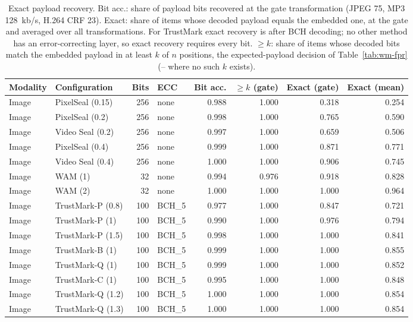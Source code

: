 \begin{table}[!t]
\centering
\footnotesize
\caption{Exact payload recovery. Bit acc.: share of payload bits recovered at the gate transformation (JPEG 75, MP3 128~kb/s, H.264 CRF 23). Exact: share of items whose decoded payload equals the embedded one, at the gate and averaged over all transformations. For TrustMark exact recovery is after BCH decoding; no other method has an error-correcting layer, so exact recovery requires every bit. $\geq k$: share of items whose decoded bits match the embedded payload in at least $k$ of $n$ positions, the expected-payload decision of Table~\ref{tab:wm-fpr} (-- where no such $k$ exists).}
\label{tab:wm-exact}
\setlength{\tabcolsep}{3.4pt}
\begin{tabular}{llrlrrrr}
\toprule
Modality & Configuration & Bits & ECC & Bit acc. & $\geq k$ (gate) & Exact (gate) & Exact (mean) \\
\midrule
Image & PixelSeal (0.15) & 256 & none & 0.988 & 1.000 & 0.318 & 0.254 \\
Image & PixelSeal (0.2) & 256 & none & 0.998 & 1.000 & 0.765 & 0.590 \\
Image & Video Seal (0.2) & 256 & none & 0.997 & 1.000 & 0.659 & 0.506 \\
Image & PixelSeal (0.4) & 256 & none & 0.999 & 1.000 & 0.871 & 0.771 \\
Image & Video Seal (0.4) & 256 & none & 1.000 & 1.000 & 0.906 & 0.745 \\
Image & WAM (1) & 32 & none & 0.994 & 0.976 & 0.918 & 0.828 \\
Image & WAM (2) & 32 & none & 1.000 & 1.000 & 1.000 & 0.964 \\
Image & TrustMark-P (0.8) & 100 & BCH\_5 & 0.977 & 1.000 & 0.847 & 0.721 \\
Image & TrustMark-P (1) & 100 & BCH\_5 & 0.990 & 1.000 & 0.976 & 0.794 \\
Image & TrustMark-P (1.5) & 100 & BCH\_5 & 0.998 & 1.000 & 1.000 & 0.841 \\
Image & TrustMark-B (1) & 100 & BCH\_5 & 0.999 & 1.000 & 1.000 & 0.855 \\
Image & TrustMark-Q (1) & 100 & BCH\_5 & 0.999 & 1.000 & 1.000 & 0.852 \\
Image & TrustMark-C (1) & 100 & BCH\_5 & 0.995 & 1.000 & 1.000 & 0.848 \\
Image & TrustMark-Q (1.2) & 100 & BCH\_5 & 1.000 & 1.000 & 1.000 & 0.854 \\
Image & TrustMark-Q (1.3) & 100 & BCH\_5 & 1.000 & 1.000 & 1.000 & 0.854 \\

\end{tabular}
\end{table}
